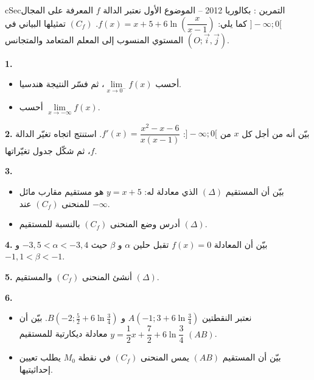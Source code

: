 \documentclass[12pt,a4paper]{article}
\newenvironment{BOX}[2]{\begin{otherlanguage}{english}\begin{arbox}{#1}{#2}}{\end{arbox}\end{otherlanguage}}
\newcounter{exo}
\newenvironment{tamrin}[1]{\stepcounter{exo}\begin{BOX}{cSec}{التمرين \theexo: #1}}{\end{BOX}}
\newenvironment{sq}{\begin{itemize}[leftmargin=2.4em,itemsep=3pt]}{\end{itemize}}
\newcommand{\qa}{\item[(أ)]}\newcommand{\qb}{\item[(ب)]}\newcommand{\qc}{\item[(جـ)]}\newcommand{\qd}{\item[(د)]}\newcommand{\qe}{\item[(هـ)]}
\newcommand{\QQ}[1]{\par\smallskip\textbf{#1.} }
\begin{document}
\begin{tamrin}{بكالوريا 2012 -- الموضوع الأول}
نعتبر الدالة $f$ المعرفة على المجال $]-\infty;0[$ كما يلي: $f(x)=x+5+6\ln\left(\dfrac{x}{x-1}\right)$.
$(C_f)$ تمثيلها البياني في المستوي المنسوب إلى المعلم المتعامد والمتجانس $(O;\vec i,\vec j)$.
\QQ{1}
\begin{sq}
\qa أحسب $\lim\limits_{x\to 0^{-}}f(x)$، ثم فسّر النتيجة هندسيا.
\qb أحسب $\lim\limits_{x\to -\infty}f(x)$.
\end{sq}
\QQ{2} بيّن أنه من أجل كل $x$ من $]-\infty;0[$: $f'(x)=\dfrac{x^2-x-6}{x(x-1)}$.
استنتج اتجاه تغيّر الدالة $f$، ثم شكّل جدول تغيّراتها.
\QQ{3}
\begin{sq}
\qa بيّن أن المستقيم $(\Delta)$ الذي معادلة له: $y=x+5$ هو مستقيم مقارب مائل للمنحنى $(C_f)$ عند $-\infty$.
\qb أدرس وضع المنحنى $(C_f)$ بالنسبة للمستقيم $(\Delta)$.
\end{sq}
\QQ{4} بيّن أن المعادلة $f(x)=0$ تقبل حلين $\alpha$ و $\beta$ حيث $-3{,}5<\alpha<-3{,}4$ و $-1{,}1<\beta<-1$.
\QQ{5} أنشئ المنحنى $(C_f)$ والمستقيم $(\Delta)$.
\QQ{6}
\begin{sq}
\qa نعتبر النقطتين $A\left(-1;3+6\ln\frac34\right)$ و $B\left(-2;\frac52+6\ln\frac34\right)$.
بيّن أن $y=\dfrac12x+\dfrac72+6\ln\dfrac34$ معادلة ديكارتية للمستقيم $(AB)$.
\qb بيّن أن المستقيم $(AB)$ يمس المنحنى $(C_f)$ في نقطة $M_0$ يطلب تعيين إحداثيتيها.
\end{sq}
\end{tamrin}
\end{document}
